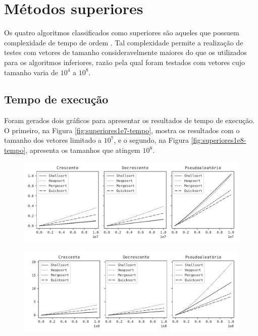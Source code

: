 \section{Métodos superiores}
Os quatro algoritmos classificados como superiores são aqueles que possuem complexidade de tempo de ordem . Tal complexidade permite a realização de testes com vetores de tamanho consideravelmente maiores do que os utilizados para os algoritmos inferiores, razão pela qual foram testados com vetores cujo tamanho varia de $10^4$ a $10^8$.

\subsection{Tempo de execução}
Foram gerados dois gráficos para apresentar os resultados de tempo de execução. O primeiro, na Figura \ref{fig:superiores1e7-tempo}, mostra os resultados com o tamanho dos vetores limitado a $10^7$, e o segundo, na Figura \ref{fig:superiores1e8-tempo}, apresenta os tamanhos que atingem $10^8$.

\begin{figure}[H]
\centering
\includegraphics[scale=0.787]{figuras/pdf/superiores1e7.tempo.pdf}
\end{figure}

\begin{figure}[H]
\centering
\includegraphics[scale=0.787]{figuras/pdf/superiores1e8.tempo.pdf}
\end{figure}

